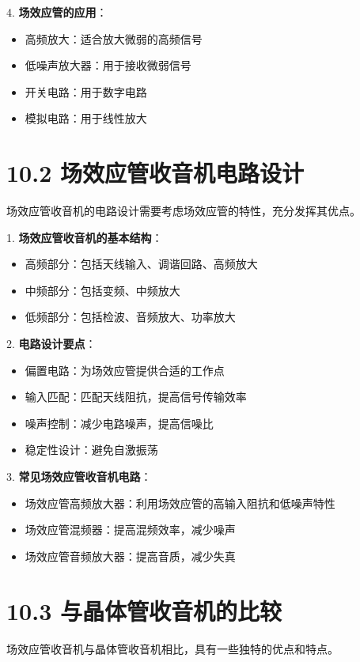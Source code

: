 \documentclass[12pt,UTF8]{ctexbook}
\begin{document}
4. \textbf{场效应管的应用}：
   \begin{itemize}[leftmargin=3.5em]
   \item 高频放大：适合放大微弱的高频信号
   \item 低噪声放大器：用于接收微弱信号
   \item 开关电路：用于数字电路
   \item 模拟电路：用于线性放大
   \end{itemize}

\section*{10.2 场效应管收音机电路设计}

场效应管收音机的电路设计需要考虑场效应管的特性，充分发挥其优点。

1. \textbf{场效应管收音机的基本结构}：
   \begin{itemize}[leftmargin=3.5em]
   \item 高频部分：包括天线输入、调谐回路、高频放大
   \item 中频部分：包括变频、中频放大
   \item 低频部分：包括检波、音频放大、功率放大
   \end{itemize}

2. \textbf{电路设计要点}：
   \begin{itemize}[leftmargin=3.5em]
   \item 偏置电路：为场效应管提供合适的工作点
   \item 输入匹配：匹配天线阻抗，提高信号传输效率
   \item 噪声控制：减少电路噪声，提高信噪比
   \item 稳定性设计：避免自激振荡
   \end{itemize}

3. \textbf{常见场效应管收音机电路}：
   \begin{itemize}[leftmargin=3.5em]
   \item 场效应管高频放大器：利用场效应管的高输入阻抗和低噪声特性
   \item 场效应管混频器：提高混频效率，减少噪声
   \item 场效应管音频放大器：提高音质，减少失真
   \end{itemize}

\section*{10.3 与晶体管收音机的比较}

场效应管收音机与晶体管收音机相比，具有一些独特的优点和特点。
\end{document}
